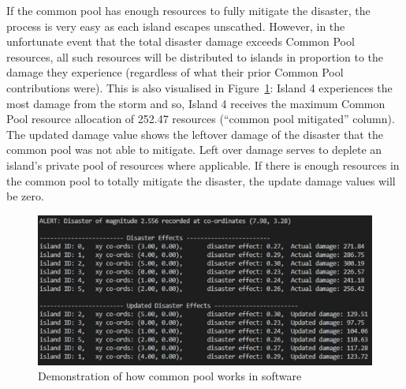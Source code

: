 If the common pool has enough resources to fully mitigate the disaster, the process is very easy as each island escapes unscathed. However, in the unfortunate event that the total disaster damage exceeds Common Pool resources, all such resources will be distributed to islands in proportion to the damage they experience (regardless of what their prior Common Pool contributions were). This is also visualised in Figure~\ref{fig:Common Pool infrastructure outcome}: Island 4 experiences the most damage from the storm and so, Island 4 receives the maximum Common Pool resource allocation of 252.47 resources (“common pool mitigated” column). The updated damage value shows the leftover damage of the disaster that the common pool was not able to mitigate. Left over damage serves to deplete an island's private pool of resources where applicable. If there is enough resources in the common pool to totally mitigate the disaster, the update damage values will be zero.

\begin{figure}[!htb]
    \centering
    \includegraphics[width=1\textwidth]{04_environment/images/Common Pool infrastructure outcome.PNG}
    \caption{Demonstration of how common pool works in software}
    \label{fig:Common Pool infrastructure outcome}
\end{figure}

